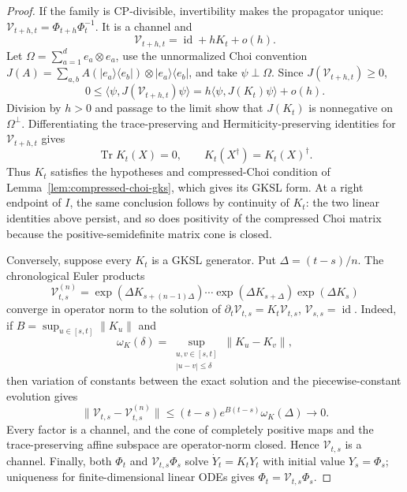 \documentclass[twoside,10pt]{article}
\numberwithin{equation}{section}
\theoremstyle{slbody}
\theoremstyle{definition}
\theoremstyle{remark}
\newcommand{\Tr}{\operatorname{Tr}}
\newcommand{\id}{\operatorname{id}}
\newcommand{\cV}{\mathcal V}
\begin{document}
\begin{proof}
If the family is CP-divisible, invertibility makes the propagator unique:
\(\cV_{t+h,t}=\Phi_{t+h}\Phi_t^{-1}\).  It is a channel and
\begin{equation*}
 \cV_{t+h,t}=\id+hK_t+o(h).
\end{equation*}
Let \(\Omega=\sum_{a=1}^d e_a\otimes e_a\), use the unnormalized
Choi convention \(J(A)=\sum_{a,b}A(|e_a\rangle\langle e_b|)\otimes
|e_a\rangle\langle e_b|\), and take
\(\psi\perp\Omega\).  Since \(J(\cV_{t+h,t})\geq0\),
\begin{equation}\label{eq:choi-tangent-condition}
 0\leq \langle\psi,J(\cV_{t+h,t})\psi\rangle
 =h\langle\psi,J(K_t)\psi\rangle+o(h).
\end{equation}
Division by \(h>0\) and passage to the limit show that
\(J(K_t)\) is nonnegative on \(\Omega^\perp\).  Differentiating the
trace-preserving and Hermiticity-preserving identities for
\(\cV_{t+h,t}\) gives
\begin{equation*}
 \Tr K_t(X)=0,
 \qquad K_t(X^\dagger)=K_t(X)^\dagger.
\end{equation*}
Thus \(K_t\) satisfies the hypotheses and compressed-Choi condition of
Lemma~\ref{lem:compressed-choi-gks}, which gives its GKSL form.  At a
right endpoint of \(I\), the same conclusion follows by
continuity of \(K_t\): the two linear identities above persist, and so
does positivity of the compressed Choi matrix because the
positive-semidefinite matrix cone is closed.

Conversely, suppose every \(K_t\) is a GKSL generator.  Put
\(\Delta=(t-s)/n\).  The chronological Euler products
\begin{equation*}
 \cV^{(n)}_{t,s}=
 \exp(\Delta K_{s+(n-1)\Delta})\cdots
 \exp(\Delta K_{s+\Delta})\exp(\Delta K_s)
\end{equation*}
converge in operator norm to the solution of
\(\partial_t\cV_{t,s}=K_t\cV_{t,s}\), \(\cV_{s,s}=\id\).  Indeed, if
\(B=\sup_{u\in[s,t]}\|K_u\|\) and
\begin{equation*}
 \omega_K(\delta)=
 \sup_{\substack{u,v\in[s,t]\\|u-v|\leq\delta}}
 \|K_u-K_v\|,
\end{equation*}
then variation of constants between the exact solution and the
piecewise-constant evolution gives
\begin{equation*}
 \|\cV_{t,s}-\cV^{(n)}_{t,s}\|
 \leq (t-s)e^{B(t-s)}\omega_K(\Delta)\longrightarrow0.
\end{equation*}
Every factor is a channel, and the cone of completely positive maps
and the trace-preserving affine subspace are operator-norm closed.
Hence \(\cV_{t,s}\) is a channel.  Finally, both \(\Phi_t\) and
\(\cV_{t,s}\Phi_s\) solve \(\dot Y_t=K_tY_t\) with initial value
\(Y_s=\Phi_s\); uniqueness for finite-dimensional linear ODEs gives
\(\Phi_t=\cV_{t,s}\Phi_s\).
\end{proof}
\end{document}

